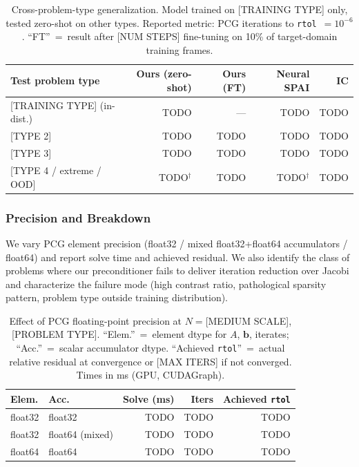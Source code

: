 \documentclass[acmtog,anonymous,review]{acmart}
\begin{document}
\begin{table}[h]
\centering
\caption{Cross-problem-type generalization.  Model trained on [TRAINING TYPE] only, tested
zero-shot on other types.  Reported metric: PCG iterations to \texttt{rtol}~$=10^{-6}$.
``FT''~=~result after [NUM STEPS] fine-tuning on 10\% of target-domain training frames.}
\label{tab:gen:type}
\begin{tabular}{lrrrr}
\hline
Test problem type & Ours (zero-shot) & Ours (FT) & Neural SPAI & IC \\
\hline
{[TRAINING TYPE]} (in-dist.) & TODO & --- & TODO & TODO \\
{[TYPE 2]}                   & TODO & TODO & TODO & TODO \\
{[TYPE 3]}                   & TODO & TODO & TODO & TODO \\
{[TYPE 4 / extreme / OOD]}   & TODO$^\dagger$ & TODO & TODO$^\dagger$ & TODO \\
\hline
\end{tabular}
\end{table}

\subsubsection{Precision and Breakdown}
\label{sec:results:precision}

We vary PCG element precision (float32 / mixed float32+float64 accumulators / float64) and
report solve time and achieved residual.  We also identify the class of problems where our
preconditioner fails to deliver iteration reduction over Jacobi and characterize the failure mode
(high contrast ratio, pathological sparsity pattern, problem type outside training distribution).

\begin{table}[h]
\centering
\caption{Effect of PCG floating-point precision at $N = $[MEDIUM SCALE], [PROBLEM TYPE].
``Elem.''~=~element dtype for $A$, $\mathbf{b}$, iterates; ``Acc.''~=~scalar accumulator dtype.
``Achieved \texttt{rtol}''~=~actual relative residual at convergence or [MAX ITERS] if not
converged. Times in ms (GPU, CUDAGraph).}
\label{tab:precision}
\begin{tabular}{llrrr}
\hline
Elem. & Acc. & Solve (ms) & Iters & Achieved \texttt{rtol} \\
\hline
float32 & float32 & TODO & TODO & TODO \\
float32 & float64 (mixed) & TODO & TODO & TODO \\
float64 & float64 & TODO & TODO & TODO \\
\hline
\end{tabular}
\end{table}
\end{document}

